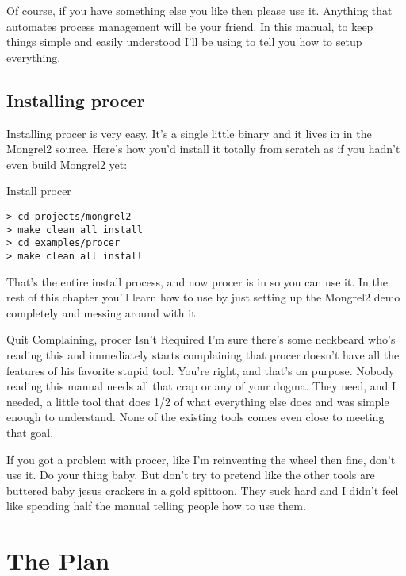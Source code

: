 Of course, if you have something else you like then please use it.  Anything that automates
process management will be your friend.  In this manual, to keep things simple and easily
understood I'll be using  to tell you how to setup everything.

\subsection{Installing procer}

Installing procer is very easy.  It's a single little binary and it lives in 
 in the Mongrel2 source.  Here's how you'd install it
totally from scratch as if you hadn't even build Mongrel2 yet:

\begin{code}{Install procer}
\begin{Verbatim}
> cd projects/mongrel2
> make clean all install
> cd examples/procer
> make clean all install
\end{Verbatim}
\end{code}

That's the entire install process, and now procer is in 
so you can use it.  In the rest of this chapter you'll learn how to use 
by just setting up the Mongrel2 demo completely and messing around with it.


\begin{aside}{Quit Complaining, procer Isn't Required}
I'm sure there's some neckbeard who's reading this and immediately starts
complaining that procer doesn't have all the features of his favorite
stupid tool.  You're right, and that's on purpose.  Nobody reading this
manual needs all that crap or any of your dogma.  They need, and I needed,
a little tool that does 1/2 of what everything else does and was simple
enough to understand.  None of the existing tools comes even close to 
meeting that goal.

If you got a problem with procer, like I'm reinventing the wheel then
fine, don't use it.  Do your thing baby.  But don't try to pretend like
the other tools are buttered baby jesus crackers in a gold spittoon.
They suck hard and I didn't feel like spending half the manual telling
people how to use them.
\end{aside}


\section{The Plan}

